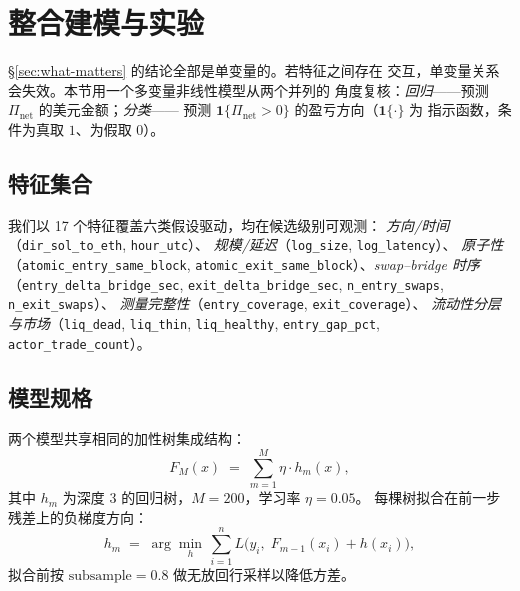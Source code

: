 \documentclass[sigconf,nonacm,10pt]{acmart}
\newcommand{\Pnet}{\Pi_{\text{net}}}
\begin{document}
\section{整合建模与实验}
\label{sec:model}

\S\ref{sec:what-matters} 的结论全部是单变量的。若特征之间存在
交互，单变量关系会失效。本节用一个多变量非线性模型从两个并列的
角度复核：\emph{回归}——预测 $\Pnet$ 的美元金额；\emph{分类}——
预测 $\mathbf{1}\{\Pnet>0\}$ 的盈亏方向（$\mathbf{1}\{\cdot\}$ 为
指示函数，条件为真取 $1$、为假取 $0$）。

\subsection{特征集合}
\label{sec:features}

我们以 17 个特征覆盖六类假设驱动，均在候选级别可观测：
\emph{方向/时间}（\texttt{dir\_sol\_to\_eth}, \texttt{hour\_utc}）、
\emph{规模/延迟}（\texttt{log\_size}, \texttt{log\_latency}）、
\emph{原子性}（\texttt{atomic\_entry\_same\_block},
\texttt{atomic\_exit\_same\_block}）、\emph{swap--bridge 时序}
（\texttt{entry\_delta\_bridge\_sec},
\texttt{exit\_delta\_bridge\_sec},
\texttt{n\_entry\_swaps}, \texttt{n\_exit\_swaps}）、
\emph{测量完整性}（\texttt{entry\_coverage}, \texttt{exit\_coverage}）、
\emph{流动性分层与市场}（\texttt{liq\_dead}, \texttt{liq\_thin},
\texttt{liq\_healthy}, \texttt{entry\_gap\_pct},
\texttt{actor\_trade\_count}）。

\subsection{模型规格}

两个模型共享相同的加性树集成结构：
\begin{equation}
F_M(x) \;=\; \sum_{m=1}^{M} \eta\cdot h_m(x),
\label{eq:gbm}
\end{equation}
其中 $h_m$ 为深度 $3$ 的回归树，$M=200$，学习率 $\eta=0.05$。
每棵树拟合在前一步残差上的负梯度方向：
\begin{equation}
h_m \;=\; \arg\min_{h}\,\sum_{i=1}^{n}
L\!\bigl(y_i,\; F_{m-1}(x_i)+h(x_i)\bigr),
\label{eq:gbm-update}
\end{equation}
拟合前按 $\text{subsample}=0.8$ 做无放回行采样以降低方差。
\end{document}
